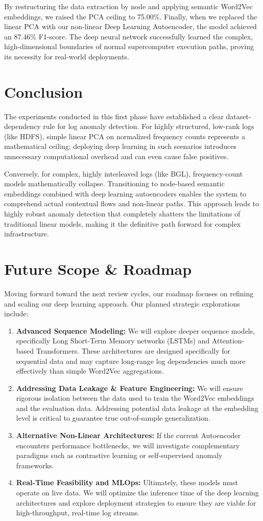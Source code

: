\documentclass[12pt]{article}
\begin{document}
By restructuring the data extraction by node and applying semantic Word2Vec embeddings, we raised the PCA ceiling to 75.00\%. Finally, when we replaced the linear PCA with our non-linear Deep Learning Autoencoder, the model achieved an 87.46\% F1-score. The deep neural network successfully learned the complex, high-dimensional boundaries of normal supercomputer execution paths, proving its necessity for real-world deployments.

\section{Conclusion}
The experiments conducted in this first phase have established a clear dataset-dependency rule for log anomaly detection. For highly structured, low-rank logs (like HDFS), simple linear PCA on normalized frequency counts represents a mathematical ceiling; deploying deep learning in such scenarios introduces unnecessary computational overhead and can even cause false positives. 

Conversely, for complex, highly interleaved logs (like BGL), frequency-count models mathematically collapse. Transitioning to node-based semantic embeddings combined with deep learning autoencoders enables the system to comprehend actual contextual flows and non-linear paths. This approach leads to highly robust anomaly detection that completely shatters the limitations of traditional linear models, making it the definitive path forward for complex infrastructure.

\section{Future Scope \& Roadmap}
Moving forward toward the next review cycles, our roadmap focuses on refining and scaling our deep learning approach. Our planned strategic explorations include:
\begin{enumerate}
    \item \textbf{Advanced Sequence Modeling:} We will explore deeper sequence models, specifically Long Short-Term Memory networks (LSTMs) and Attention-based Transformers. These architectures are designed specifically for sequential data and may capture long-range log dependencies much more effectively than simple Word2Vec aggregations.
    \item \textbf{Addressing Data Leakage \& Feature Engineering:} We will ensure rigorous isolation between the data used to train the Word2Vec embeddings and the evaluation data. Addressing potential data leakage at the embedding level is critical to guarantee true out-of-sample generalization.
    \item \textbf{Alternative Non-Linear Architectures:} If the current Autoencoder encounters performance bottlenecks, we will investigate complementary paradigms such as contrastive learning or self-supervised anomaly frameworks.
    \item \textbf{Real-Time Feasibility and MLOps:} Ultimately, these models must operate on live data. We will optimize the inference time of the deep learning architectures and explore deployment strategies to ensure they are viable for high-throughput, real-time log streams.
\end{enumerate}
\end{document}

